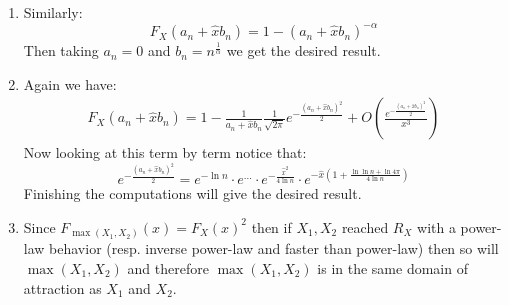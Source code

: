 \documentclass[10pt,a4paper]{book}
\begin{document}
\begin{enumerate}
\item Similarly:
\[
F_X(a_n + \hat{x} b_n) = 1 - (a_n + \hat{x} b_n)^{-\alpha}
\]
Then taking $a_n = 0$ and $b_n = n^{\frac{1}{\alpha}}$ we get the desired result.


\item Again we have:
\begin{align*}
F_X(a_n + \hat{x} b_n) = 1 - \frac{1}{a_n + \hat{x} b_n} \frac{1}{\sqrt{2 \pi}} e^{- \frac{(a_n + \hat{x} b_n)^2}{2}} + O\left( \frac{e^{-\frac{(a_n + \hat{x} b_n)^2}{2}}}{x^3} \right)
\end{align*}
Now looking at this term by term notice that:
\[
e^{-\frac{(a_n + \hat{x} b_n)^2}{2}} = e^{- \ln n} \cdot e^{...} \cdot e^{- \frac{\hat{x}^2}{4 \ln n}} \cdot e^{- \hat{x} (1 + \frac{\ln\ln n + \ln 4 \pi}{4 \ln n})}
\]
Finishing the computations will give the desired result.

\item Since $F_{\max(X_1, X_2)}(x) = F_X(x)^2$ then if $X_1, X_2$ reached $R_X$ with a power-law behavior (resp. inverse power-law and faster than power-law) then so will $\max(X_1, X_2)$ and therefore $\max(X_1, X_2)$ is in the same domain of attraction as $X_1$ and $X_2$. 

\end{enumerate}
\end{document}
